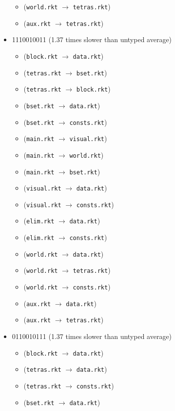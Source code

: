 \documentclass{article}
\newcommand{\mono}[1]{\texttt{#1}}
\begin{document}
\begin{itemize}
\begin{itemize}
  \item (\mono{world.rkt} $\rightarrow$ \mono{tetras.rkt})
  \item (\mono{aux.rkt} $\rightarrow$ \mono{tetras.rkt})
  \end{itemize}
\item 1110010011 (1.37 times slower than untyped average)
  \begin{itemize}
  \item (\mono{block.rkt} $\rightarrow$ \mono{data.rkt})
  \item (\mono{tetras.rkt} $\rightarrow$ \mono{bset.rkt})
  \item (\mono{tetras.rkt} $\rightarrow$ \mono{block.rkt})
  \item (\mono{bset.rkt} $\rightarrow$ \mono{data.rkt})
  \item (\mono{bset.rkt} $\rightarrow$ \mono{consts.rkt})
  \item (\mono{main.rkt} $\rightarrow$ \mono{visual.rkt})
  \item (\mono{main.rkt} $\rightarrow$ \mono{world.rkt})
  \item (\mono{main.rkt} $\rightarrow$ \mono{bset.rkt})
  \item (\mono{visual.rkt} $\rightarrow$ \mono{data.rkt})
  \item (\mono{visual.rkt} $\rightarrow$ \mono{consts.rkt})
  \item (\mono{elim.rkt} $\rightarrow$ \mono{data.rkt})
  \item (\mono{elim.rkt} $\rightarrow$ \mono{consts.rkt})
  \item (\mono{world.rkt} $\rightarrow$ \mono{data.rkt})
  \item (\mono{world.rkt} $\rightarrow$ \mono{tetras.rkt})
  \item (\mono{world.rkt} $\rightarrow$ \mono{consts.rkt})
  \item (\mono{aux.rkt} $\rightarrow$ \mono{data.rkt})
  \item (\mono{aux.rkt} $\rightarrow$ \mono{tetras.rkt})
  \end{itemize}
\item 0110010111 (1.37 times slower than untyped average)
  \begin{itemize}
  \item (\mono{block.rkt} $\rightarrow$ \mono{data.rkt})
  \item (\mono{tetras.rkt} $\rightarrow$ \mono{data.rkt})
  \item (\mono{tetras.rkt} $\rightarrow$ \mono{consts.rkt})
  \item (\mono{bset.rkt} $\rightarrow$ \mono{data.rkt})

\end{itemize}
\end{itemize}
\end{document}
